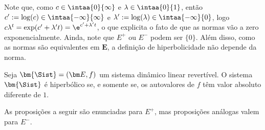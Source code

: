 Note que, como $c \in \intaa{0}{\infty}$ e $\lambda \in \intaa{0}{1}$, então $c' := \log(c) \in \intaa{-\infty}{\infty}$ e $\lambda' := \log(\lambda) \in \intaa{-\infty}{0}$, logo $c\lambda^t = \exp(c'+\lambda't) = \e^{c'+\lambda't}$, o que explicita o fato de que as normas vão a zero exponencialmente. Ainda, note que $E^+$ ou $E^-$ podem ser $\{0\}$. Além disso, como as normas são equivalentes em $\bm E$, a definição de hiperbolicidade não depende da norma.

\begin{proposition}
Seja $\bm{\Sist}=(\bm E,f)$ um sistema dinâmico linear revertível. O sistema $\bm{\Sist}$ é hiperbólico se, e somente se, os autovalores de $f$ têm valor absoluto diferente de $1$.
\end{proposition}

As proposições a seguir são enunciadas para $E^+$, mas proposições análogas valem para $E^-$.

